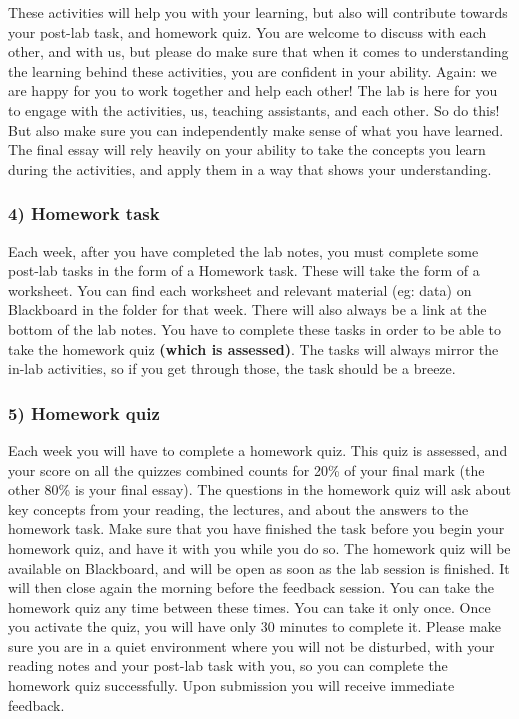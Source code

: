 \documentclass[
]{book}
\begin{document}
These activities will help you with your learning, but also will contribute towards your post-lab task, and homework quiz. You are welcome to discuss with each other, and with us, but please do make sure that when it comes to understanding the learning behind these activities, you are confident in your ability. Again: we are happy for you to work together and help each other! The lab is here for you to engage with the activities, us, teaching assistants, and each other. So do this! But also make sure you can independently make sense of what you have learned. The final essay will rely heavily on your ability to take the concepts you learn during the activities, and apply them in a way that shows your understanding.

\hypertarget{homework-task}{%
\subsubsection*{4) Homework task}\label{homework-task}}

Each week, after you have completed the lab notes, you must complete some post-lab tasks in the form of a Homework task. These will take the form of a worksheet. You can find each worksheet and relevant material (eg: data) on Blackboard in the folder for that week. There will also always be a link at the bottom of the lab notes. You have to complete these tasks in order to be able to take the homework quiz \textbf{(which is assessed)}. The tasks will always mirror the in-lab activities, so if you get through those, the task should be a breeze.

\hypertarget{homework-quiz}{%
\subsubsection*{5) Homework quiz}\label{homework-quiz}}

Each week you will have to complete a homework quiz. This quiz is assessed, and your score on all the quizzes combined counts for 20\% of your final mark (the other 80\% is your final essay). The questions in the homework quiz will ask about key concepts from your reading, the lectures, and about the answers to the homework task. Make sure that you have finished the task before you begin your homework quiz, and have it with you while you do so. The homework quiz will be available on Blackboard, and will be open as soon as the lab session is finished. It will then close again the morning before the feedback session. You can take the homework quiz any time between these times. You can take it only once. Once you activate the quiz, you will have only 30 minutes to complete it. Please make sure you are in a quiet environment where you will not be disturbed, with your reading notes and your post-lab task with you, so you can complete the homework quiz successfully. Upon submission you will receive immediate feedback.
\end{document}
